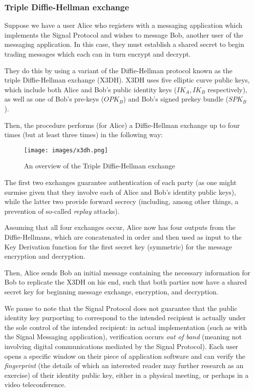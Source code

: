\documentclass[12pt]{article}
\begin{document}
\subsubsection{Triple Diffie-Hellman exchange}
Suppose we have a user Alice who registers with a messaging application which implements the Signal Protocol and wishes to message Bob, another user of the messaging application. In this case, they must establish a shared secret to begin trading messages which each can in turn encrypt and decrypt. 
\par They do this by using a variant of the Diffie-Hellman protocol known as the triple Diffie-Hellman exchange (X3DH). X3DH uses five elliptic curve public keys, which include both Alice and Bob's public identity keys ($IK_A, IK_B$ respectively), as well as one of Bob's pre-keys ($OPK_B$) and Bob's signed prekey bundle ($SPK_B$).\parencite{website:sigdocX3DH}
\par Then, the procedure performs (for Alice) a Diffie-Hellman exchange up to four times (but at least three times) in the following way: 

\begin{figure}[h!]
    \centering
    \texttt{[image: images/x3dh.png]}
    \caption{An overview of the Triple Diffie-Hellman exchange\parencite{website:sigdocX3DH}}
    \label{fig:my_label2}
\end{figure}

\newpage 
\par The first two exchanges guarantee authentication of each party (as one might surmise given that they involve each of Alice and Bob's identity public keys), while the latter two provide forward secrecy (including, among other things, a prevention of so-called \textit{replay} attacks). 
\par Assuming that all four exchanges occur, Alice now has four outputs from the Diffie-Hellmans, which are concatenated in order and then used as input to the Key Derivation function for the first secret key (symmetric) for the message encryption and decryption.
\par Then, Alice sends Bob an initial message containing the necessary information for Bob to replicate the X3DH on his end, such that both parties now have a shared secret key for beginning message exchange, encryption, and decryption.
\par We pause to note that the Signal Protocol does not guarantee that the public identity key purporting to correspond to the intended recipient is actually under the sole control of the intended recipient: in actual implementation (such as with the Signal Messaging application), verification occurs \textit{out of band} (meaning not involving digital communications mediated by the Signal Protocol). Each user opens a specific window on their piece of application software and can verify the \textit{fingerprint} (the details of which an interested reader may further research as an exercise) of their identity public key, either in a physical meeting, or perhaps in a video teleconference.
 
\end{document}
